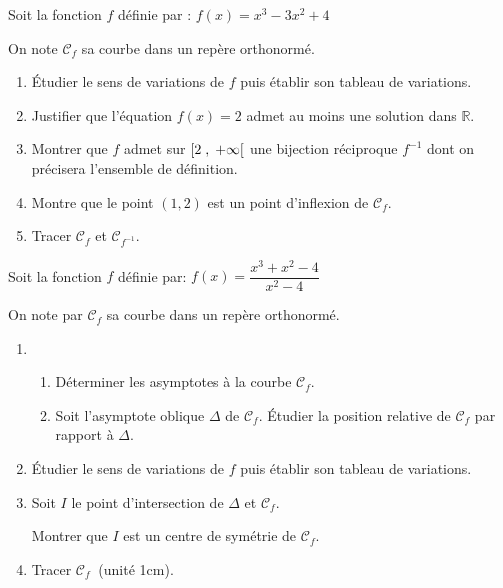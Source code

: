 



 \summary{}
 
	\begin{exercice}
Soit la fonction $ f $ définie par :
$ f(x)=x^3-3x^2+4 $

On note $\mathscr{C}_{f}$ 
sa courbe dans un repère orthonormé.
\begin{enumerate}
\item Étudier le sens de variations de $ f $  puis établir son tableau de  variations.
\item Justifier que l'équation $ f(x)=2 $ admet au moins une solution dans $ \mathbb{R} $.
\item  Montrer que $ f $ admet sur $ \left[2 \;,\; +\infty\right[ $ une bijection réciproque $ f^{-1} $ dont on précisera l'ensemble de définition.
\item Montre que  le point $(1, 2)$ est un point d'inflexion de $\mathscr{C}_{f}$.  
\item Tracer $\mathscr{C}_{f}$ et $\mathscr{C}_{f^{-1}}$.
\end{enumerate}
\end{exercice}

\begin{exercice}
Soit la fonction $ f $ définie par:
 $ f(x)=\dfrac{x^3+x^2-4}{x^2-4} $ 
\medskip

 On note par $\mathscr{C}_{f}$  sa courbe dans un repère orthonormé.
\begin{enumerate}
\item 
\begin{enumerate} 
\item Déterminer les asymptotes à la courbe $\mathscr{C}_{f}$.
\item Soit l'asymptote oblique $ \Delta $ de $ \mathcal{C}_f $.
Étudier la position relative de $ \mathcal{C}_f $ par rapport à $ \Delta $.
\end{enumerate}
\item Étudier le sens de variations de $ f $  puis établir son tableau de  variations.
\item Soit $ I $ le point d'intersection de $\Delta$ et $\mathscr{C}_{f}$.

 Montrer que $ I $  est un centre de symétrie de  $\mathscr{C}_{f}$.
\item Tracer $\mathscr{C}_{f}\: $ (unité 1cm).
\end{enumerate}
\end{exercice}

